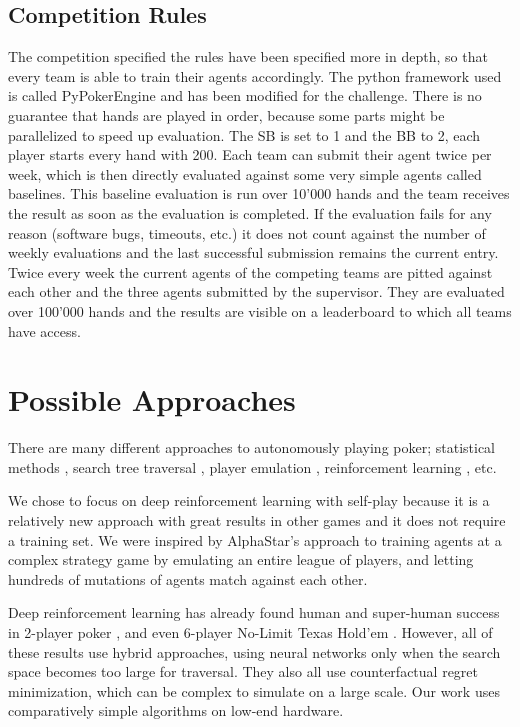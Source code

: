 \subsection{Competition Rules}
The competition specified the rules have been specified more in depth, so that every team is able to train their agents accordingly. The python framework used is called PyPokerEngine \cite{Pypokerengine} and has been modified for the challenge. There is no guarantee that hands are played in order, because some parts might be parallelized to speed up evaluation. The SB is set to 1 and the BB to 2, each player starts every hand with 200. Each team can submit their agent twice per week, which is then directly evaluated against some very simple agents called baselines. This baseline evaluation is run over 10'000 hands and the team receives the result as soon as the evaluation is completed. If the evaluation fails for any reason (software bugs, timeouts, etc.) it does not count against the number of weekly evaluations and the last successful submission remains the current entry. Twice every week the current agents of the competing teams are pitted against each other and the three agents submitted by the supervisor. They are evaluated over 100'000 hands and the results are visible on a leaderboard to which all teams have access.


\section{Possible Approaches}
There are many different approaches to autonomously playing poker; statistical methods \cite{PokerStatMethods1} \cite{PokerStatMethods2}, search tree traversal \cite{PokerTreeSearch} \cite{Deepstack}, player emulation \cite{PokerPlayerEmulation}, reinforcement learning \cite{Deepstack} \cite{Libratus} \cite{Pluribus} \cite{PokerReinforcementLearning}, etc.

We chose to focus on deep reinforcement learning with self-play because it is a relatively new approach with great results in other games \cite{GamesRL} \cite{OpenAIFive} \cite{Alphago} \cite{AlphaStar} and it does not require a training set. We were inspired by AlphaStar's \cite{AlphaStar} approach to training agents at a complex strategy game by emulating an entire league of players, and letting hundreds of mutations of agents match against each other.

Deep reinforcement learning has already found human and super-human success in 2-player poker \cite{Deepstack} \cite{Libratus}, and even 6-player No-Limit Texas Hold'em \cite{Pluribus}. However, all of these results use hybrid approaches, using neural networks only when the search space becomes too large for traversal. They also all use counterfactual regret minimization, which can be complex to simulate on a large scale. Our work uses comparatively simple algorithms on low-end hardware.
